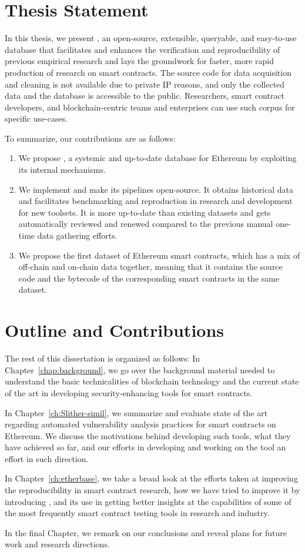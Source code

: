 \section{Thesis Statement}
  In this thesis, we present \etherbase, an open-source, extensible, queryable, and easy-to-use database that facilitates and enhances the verification and reproducibility of previous empirical research and lays the groundwork for faster, more rapid production of research on smart contracts.
  The source code for data acquisition and cleaning is not available due to private IP reasons, and only the collected data and the database is accessible to the public.
  Researchers, smart contract developers, and blockchain-centric teams and enterprises can use such corpus for specific use-cases.

  To summarize, our contributions are as follows:
  \begin{enumerate}
    \item We propose \etherbase, a systemic and up-to-date database for Ethereum by exploiting its internal mechanisms.
    \item We implement \etherbase and make its pipelines open-source. It obtains historical data and facilitates benchmarking and reproduction in research and development for new toolsets. It is more up-to-date than existing datasets and gets automatically reviewed and renewed compared to the previous manual one-time data gathering efforts.
    \item We propose the first dataset of Ethereum smart contracts, which has a mix of off-chain and on-chain data together, meaning that it contains the source code and the bytecode of the corresponding smart contracts in the same dataset.
  \end{enumerate}


\section{Outline and Contributions}

  The rest of this dissertation is organized as follows:
  In Chapter~\ref{chap:background}, we go over the background material needed to understand the basic technicalities of blockchain technology and the current state of the art in developing security-enhancing tools for smart contracts.

  In Chapter~\ref{ch:Slither-simil}, we summarize and evaluate state of the art regarding automated vulnerability analysis practices for smart contracts on Ethereum.
  We discuss the motivations behind developing such tools, what they have achieved so far, and our efforts in developing and working on the tool \slithersimil an effort in such direction.

  In Chapter~\ref{ch:etherbase}, we take a broad look at the efforts taken at improving the reproducibility in smart contract research, how we have tried to improve it by introducing \etherbase, and its use in getting better insights at the capabilities of some of the most frequently smart contract testing tools in research and industry.

  In the final Chapter, we remark on our conclusions and reveal plans for future work and research directions.